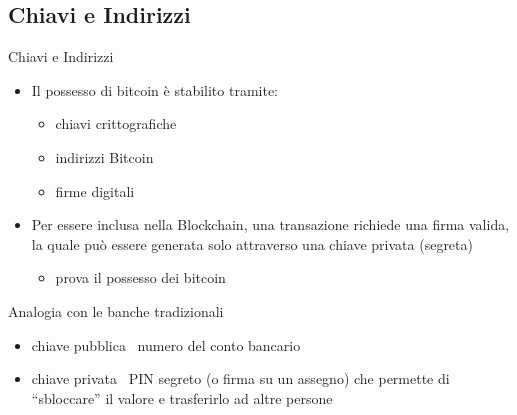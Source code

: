 \documentclass{beamer}
\begin{document}
  \subsection{Chiavi e Indirizzi}
  \begin{frame}{Chiavi e Indirizzi}
    \begin{itemize}
      \item Il possesso di bitcoin è stabilito tramite:
      \begin{itemize}
          \item chiavi crittografiche 
          \item indirizzi Bitcoin 
          \item firme digitali
      \end{itemize} 
      \item Per essere inclusa nella Blockchain, una transazione richiede una firma valida, la quale può essere generata solo attraverso una chiave privata (segreta)  
      \begin{itemize}
          \item prova il possesso dei bitcoin
      \end{itemize}
    \pause
    \end{itemize}
    \begin{block}{Analogia con le banche tradizionali}
      \begin{itemize}
        \item chiave pubblica \MVRightarrow\, numero del conto bancario
        \item chiave privata \MVRightarrow\, PIN segreto (o firma su un assegno) che permette di ``sbloccare'' il valore e trasferirlo ad altre persone 
      \end{itemize}
    \end{block}
  \end{frame}
\end{document}
